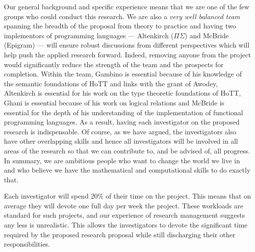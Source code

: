 \documentclass[a4paper,11pt]{article}
\begin{document}
\noindent Our general background and specific experience means that
we are one of the few groups who could conduct this research. We are
also a {\em very well balanced team} spanning the breadth of the
proposal from theory to practice and having two implementors of
programming languages --- Altenkirch ($\Pi\Sigma$) and McBride
(Epigram) --- will ensure robust discussions from different
perspectives which will help push the applied research forward.
Indeed, removing anyone from the project would significantly
reduce the strength of the team and the prospects for
completion. Within the team, Gambino is essential because of his
knowledge of the semantic foundations of HoTT and links with the grant
of Awodey, Altenkirch is essential for his work on the type theoretic
foundations of HoTT, Ghani is essential because of his work on logical
relations and McBride is essential for the depth of his understanding
of the implementation of functional programming languages.  As a
result, having each investigator on the proposed research is
indispensable. Of course, as we have argued, the investigators also
have other overlapping skills and hence all investigators will be
involved in all areas of the research so that we can contribute to,
and be advised of, all progress. In summary, we are ambitious people
who want to change the world we live in and who believe we have the
mathematical and computational skills to do exactly that.



\vspace{0.02in}

Each investigator will spend 20\% of their time on the project.
This means that on average they will devote one
full day per week the project. These workloads are standard for such projects, and
our experience of research management suggests any less is 
unrealistic. This allows the investigators to devote the significant
time required by the proposed research proposal while still discharging
their other responsibilities.

\vspace{0.02in}
\end{document}
